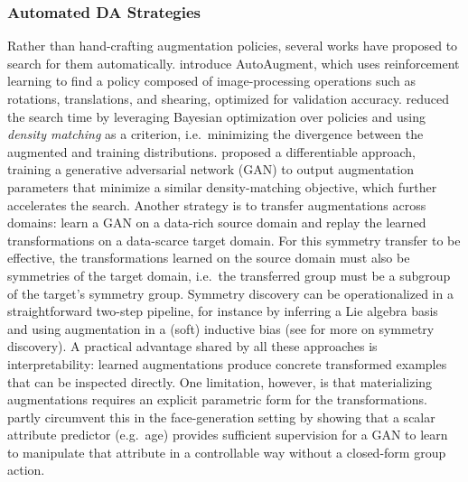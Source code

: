 \documentclass[mathematics,review,submit,moreauthors]{Definitions/mdpi}
\begin{document}
\subsubsection{Automated DA Strategies}\label{par:auto-da}
Rather than hand-crafting augmentation policies, several works have proposed to search for them automatically.
\citet{cubuk20192iccvprc} introduce AutoAugment, which uses reinforcement learning to find a policy composed of image-processing operations such as rotations, translations, and shearing, optimized for validation accuracy.
\citet{lim2019anips} reduced the search time by leveraging Bayesian optimization over policies and using \textit{density matching} as a criterion, i.e.\ minimizing the divergence between the augmented and training distributions.
\citet{hataya2020cv-e2} proposed a differentiable approach, training a generative adversarial network (GAN) to output augmentation parameters that minimize a similar density-matching objective, which further accelerates the search.
Another strategy is to transfer augmentations across domains: \citet{antoniou2018} learn a GAN on a data-rich source domain and replay the learned transformations on a data-scarce target domain.
For this symmetry transfer to be effective, the transformations learned on the source domain must also be symmetries of the target domain, i.e.\ the transferred group must be a subgroup of the target's symmetry group. 
Symmetry discovery can be operationalized in a straightforward two-step pipeline, for instance by inferring a Lie algebra basis and using augmentation in a (soft) inductive bias \citep{escriche2025,yang2023p4icml} (see  for more on symmetry discovery).
A practical advantage shared by all these approaches is interpretability: learned augmentations produce concrete transformed examples that can be inspected directly.
One limitation, however, is that materializing augmentations requires an explicit parametric form for the transformations.
\citet{shoshan2021} partly circumvent this in the face-generation setting by showing that a scalar attribute predictor (e.g.\ age) provides sufficient supervision for a GAN to learn to manipulate that attribute in a controllable way without a closed-form group action.
\end{document}
